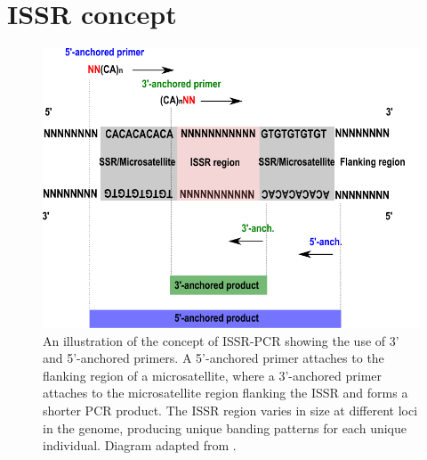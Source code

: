 \section{ISSR concept}
\begin{figure}[H]
	\centering
	\includegraphics[scale = 1]{Images/issr.pdf}
    \newline
	\caption{An illustration of the concept of ISSR-PCR showing the use of 3' and 5'-anchored primers. A 5’-anchored primer attaches to the flanking region of a microsatellite, where a 3’-anchored primer attaches to the microsatellite region flanking the ISSR and forms a shorter PCR product. The ISSR region varies in size at different loci in the genome, producing unique banding patterns for each unique individual. Diagram adapted from \citet{Zietkiewicz1994,Reddy2002,Ng2015Inter-SimpleRight}.} 
	\label{fig:issr}
\end{figure}